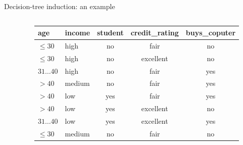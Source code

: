 \documentclass[aspectratio=169,t,table]{beamer}
\begin{document}
{\begin{frame}{Decision-tree induction: an example}
\begin{columns}
\begin{column}{0.4\textwidth}
\begin{itemize}
          \end{itemize}
        \end{column}
        \begin{column}{0.6\textwidth}
          \begin{tabular}{|l|l|c|c|c|}
            \hline
            \cellcolor{blue!20}age & \cellcolor{blue!20}income & \cellcolor{blue!20}student & \cellcolor{blue!20}credit\_rating & \cellcolor{blue!20}buys\_coputer \\\hline
            \cellcolor{yellow!20}$\leq 30$ & \cellcolor{yellow!20}high & \cellcolor{yellow!20}no & \cellcolor{yellow!20}fair & \cellcolor{red!20}no \\\hline
            \cellcolor{yellow!20}$\leq 30$ & \cellcolor{yellow!20}high & \cellcolor{yellow!20}no & \cellcolor{yellow!20}excellent & \cellcolor{red!20}no \\\hline
            \cellcolor{yellow!20}$31\ldots40$ & \cellcolor{yellow!20}high & \cellcolor{yellow!20}no & \cellcolor{yellow!20}fair & \cellcolor{green!20}yes \\\hline
            \cellcolor{yellow!20}$>40$ & \cellcolor{yellow!20}medium & \cellcolor{yellow!20}no & \cellcolor{yellow!20}fair & \cellcolor{green!20}yes \\\hline
            \cellcolor{yellow!20}$>40$ & \cellcolor{yellow!20}low & \cellcolor{yellow!20}yes & \cellcolor{yellow!20}fair & \cellcolor{green!20}yes \\\hline
            \cellcolor{yellow!20}$>40$ & \cellcolor{yellow!20}low & \cellcolor{yellow!20}yes & \cellcolor{yellow!20}excellent & \cellcolor{red!20}no \\\hline
            \cellcolor{yellow!20}$31\ldots40$ & \cellcolor{yellow!20}low & \cellcolor{yellow!20}yes & \cellcolor{yellow!20}excellent & \cellcolor{green!20}yes \\\hline
            \cellcolor{yellow!20}$\leq 30$ & \cellcolor{yellow!20}medium & \cellcolor{yellow!20}no & \cellcolor{yellow!20}fair & \cellcolor{red!20}no \\\hline

\end{tabular}
\end{column}
\end{columns}
\end{frame}}
\end{document}
